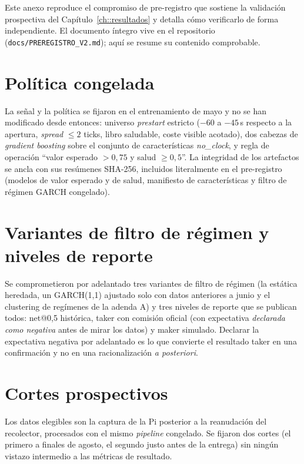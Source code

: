 Este anexo reproduce el compromiso de pre-registro que sostiene la validación
prospectiva del Capítulo~\ref{ch::resultados} y detalla cómo verificarlo de forma
independiente. El documento íntegro vive en el repositorio
(\texttt{docs/PREREGISTRO\_V2.md}); aquí se resume su contenido comprobable.

\section*{Política congelada}

La señal y la política se fijaron en el entrenamiento de mayo y no se han modificado
desde entonces: universo \emph{prestart} estricto ($-60$ a $-45$\,s respecto a la
apertura, \emph{spread} $\le 2$ ticks, libro saludable, coste visible acotado), dos
cabezas de \emph{gradient boosting} sobre el conjunto de características \emph{no\_clock},
y regla de operación ``valor esperado $>0{,}75$ y salud $\ge 0{,}5$''. La integridad de
los artefactos se ancla con sus resúmenes SHA-256, incluidos literalmente en el
pre-registro (modelos de valor esperado y de salud, manifiesto de características y
filtro de régimen GARCH congelado).

\section*{Variantes de filtro de régimen y niveles de reporte}

Se comprometieron por adelantado tres variantes de filtro de régimen (la estática heredada,
un GARCH(1,1) ajustado solo con datos anteriores a junio y el clustering de regímenes de la
adenda A) y tres niveles de reporte que se publican todos: net@0,5 histórica, taker con
comisión oficial (con expectativa \emph{declarada como negativa} antes de mirar los
datos) y maker simulado. Declarar la expectativa negativa por adelantado es lo que
convierte el resultado taker en una confirmación y no en una racionalización
\emph{a posteriori}.

\section*{Cortes prospectivos}

Los datos elegibles son la captura de la Pi posterior a la reanudación del recolector,
procesados con el mismo \emph{pipeline} congelado. Se fijaron dos cortes (el primero a
finales de agosto, el segundo justo antes de la entrega) sin ningún vistazo intermedio a
las métricas de resultado.


